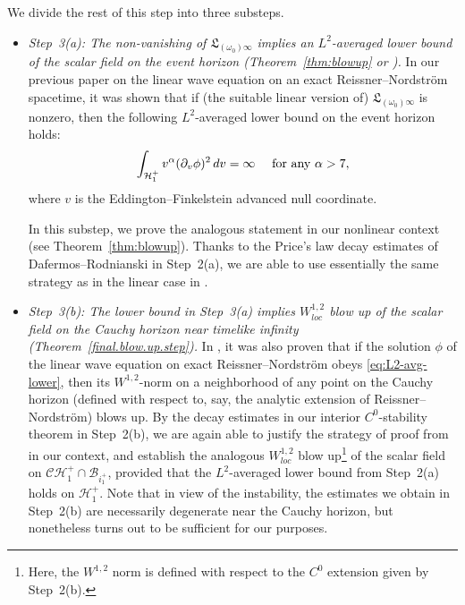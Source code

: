 \documentclass[10pt, reqno]{amsart}
\theoremstyle{definition}
\theoremstyle{remark}
\numberwithin{equation}{section}
\newcommand{\ud}{d}
\newcommand{\rd}{\partial}
\newcommand{\0}{\emptyset}
\newcommand{\alp}{\alpha}
\newcommand{\omg}{\omega}
\newcommand{\calC}{\mathcal C}
\newcommand{\calH}{\mathcal H}
\newcommand{\CH}{\calC \calH^{+}}		%
\newcommand{\EH}{\calH^{+}}
\newcommand{\pfstep}[1]{\vspace{.5em} {\it \noindent #1.}}
\newcommand{\Int}{\mathscr{B}}
\begin{document}
We divide the rest of this step into three substeps.
\begin{itemize}
\item \pfstep{Step~3(a): The non-vanishing of $\mathfrak L_{(\omg_{0}) \infty}$ implies an $L^2$-averaged lower bound of the scalar field on the event horizon (Theorem~\ref{thm:blowup} or \cite[Theorem~4.1]{LO.exterior})} 
In our previous paper \cite{LO.instab} on the linear wave equation on an exact Reissner--Nordstr\"om spacetime, it was shown that if (the suitable linear version of) $\mathfrak{L}_{(\omg_{0}) \infty}$ is nonzero, then the following $L^{2}$-averaged lower bound on the event horizon holds:
\begin{equation} \label{eq:L2-avg-lower}
	\int_{\EH_{1}} v^{\alp} (\rd_{v} \phi)^{2} \, \ud v = \infty \quad \hbox{ for any } \alp > 7,
\end{equation}
where $v$ is the Eddington--Finkelstein advanced null coordinate.

In this substep, we prove the analogous statement in our nonlinear context (see Theorem~\ref{thm:blowup}). Thanks to the Price's law decay estimates of Dafermos--Rodnianski in Step~2(a), we are able to use essentially the same strategy as in the linear case in \cite{LO.instab}.

\item \pfstep{Step~3(b): The lower bound in Step~3(a) implies $W^{1,2}_{loc}$ blow up of the scalar field on the Cauchy horizon near timelike infinity (Theorem~\ref{final.blow.up.step})} 
In \cite{LO.instab}, it was also proven that if the solution $\phi$ of the linear wave equation on exact Reissner--Nordstr\"om obeys \eqref{eq:L2-avg-lower}, then its $W^{1,2}$-norm on a neighborhood of any point on the Cauchy horizon (defined with respect to, say, the analytic extension of Reissner--Nordstr\"om) blows up.
By the decay estimates in our interior $C^{0}$-stability theorem in Step~2(b), we are again able to justify the strategy of proof from \cite{LO.instab} in our context, and establish the analogous $W^{1,2}_{loc}$ blow up\footnote{Here, the $W^{1,2}$ norm is defined with respect to the $C^{0}$ extension given by Step~2(b).} of the scalar field on $\CH_{1} \cap \Int_{i^{+}_{1}}$, provided that the $L^{2}$-averaged lower bound from Step~2(a) holds on $\EH_{1}$. Note that in view of the instability, the estimates we obtain in Step~2(b) are necessarily degenerate near the Cauchy horizon, but nonetheless turns out to be sufficient for our purposes.


\end{itemize}
\end{document}
